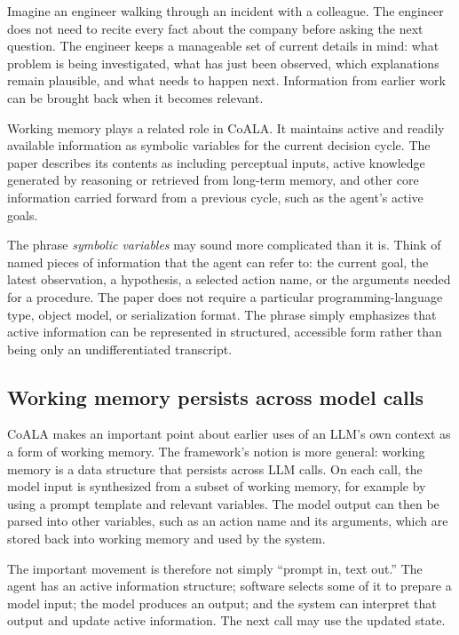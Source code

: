 Imagine an engineer walking through an incident with a colleague. The engineer does not need to recite every fact about the company before asking the next question. The engineer keeps a manageable set of current details in mind: what problem is being investigated, what has just been observed, which explanations remain plausible, and what needs to happen next. Information from earlier work can be brought back when it becomes relevant.

Working memory plays a related role in CoALA. It maintains active and readily available information as symbolic variables for the current decision cycle. The paper describes its contents as including perceptual inputs, active knowledge generated by reasoning or retrieved from long-term memory, and other core information carried forward from a previous cycle, such as the agent's active goals.

The phrase \emph{symbolic variables} may sound more complicated than it is. Think of named pieces of information that the agent can refer to: the current goal, the latest observation, a hypothesis, a selected action name, or the arguments needed for a procedure. The paper does not require a particular programming-language type, object model, or serialization format. The phrase simply emphasizes that active information can be represented in structured, accessible form rather than being only an undifferentiated transcript.

\subsection{Working memory persists across model calls}

CoALA makes an important point about earlier uses of an LLM's own context as a form of working memory. The framework's notion is more general: working memory is a data structure that persists across LLM calls. On each call, the model input is synthesized from a subset of working memory, for example by using a prompt template and relevant variables. The model output can then be parsed into other variables, such as an action name and its arguments, which are stored back into working memory and used by the system.

The important movement is therefore not simply ``prompt in, text out.'' The agent has an active information structure; software selects some of it to prepare a model input; the model produces an output; and the system can interpret that output and update active information. The next call may use the updated state.

